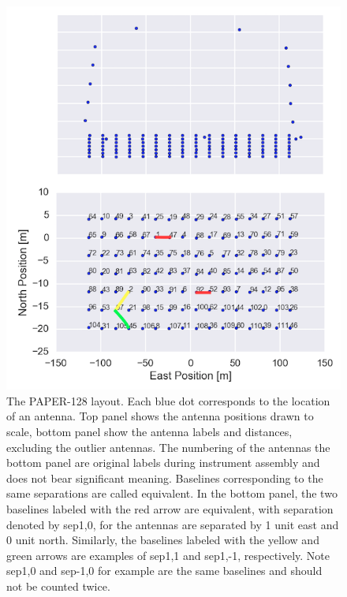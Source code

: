 \documentclass[preprint2,numberedappendix,tighten,twocolappendix]{aastex6}  %
\renewcommand\[{\begin{equation}}
\renewcommand\]{\end{equation}}
\begin{document}
\begin{figure}[H]
\includegraphics[width=\linewidth]{antpos128}

\caption{The PAPER-128 layout. Each blue dot corresponds to the location of
an antenna. Top panel shows the antenna positions drawn to scale,
bottom panel show the antenna labels and distances, excluding the outlier
antennas.\label{fig:AntPos}
The numbering of the antennas the bottom panel are original labels
during instrument assembly and does not bear significant
meaning. Baselines corresponding to the same separations are called
equivalent. In the bottom panel, the two baselines labeled with the
red arrow are equivalent, with separation denoted by sep1,0, for the
antennas are separated by 1 unit east and 0 unit north. Similarly,
the baselines labeled with the yellow and green arrows are examples
of sep1,1 and sep1,-1, respectively. Note sep1,0 and sep-1,0 for example
are the same baselines and should not be counted twice.}

\end{figure}
\end{document}

